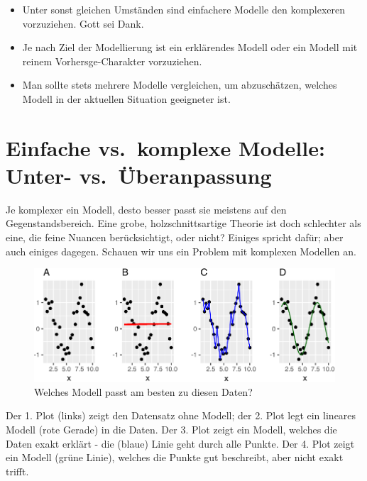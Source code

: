 \documentclass[12pt,]{book}
\begin{document}
\begin{itemize}
\item
  Unter sonst gleichen Umständen sind einfachere Modelle den komplexeren
  vorzuziehen. Gott sei Dank.
\item
  Je nach Ziel der Modellierung ist ein erklärendes Modell oder ein
  Modell mit reinem Vorhersge-Charakter vorzuziehen.
\item
  Man sollte stets mehrere Modelle vergleichen, um abzuschätzen, welches
  Modell in der aktuellen Situation geeigneter ist.
\end{itemize}

\section{Einfache vs.~komplexe Modelle: Unter-
vs.~Überanpassung}\label{einfache-vs.komplexe-modelle-unter--vs.uberanpassung}

Je komplexer ein Modell, desto besser passt sie meistens auf den
Gegenstandsbereich. Eine grobe, holzschnittsartige Theorie ist doch
schlechter als eine, die feine Nuancen berücksichtigt, oder nicht?
Einiges spricht dafür; aber auch einiges dagegen. Schauen wir uns ein
Problem mit komplexen Modellen an.

\begin{figure}

{\centering \includegraphics[width=0.9\linewidth]{060_Modellieren_files/figure-latex/overfitting-4-plots-1} 

}

\caption{Welches Modell passt am besten zu diesen Daten?}\label{fig:overfitting-4-plots}
\end{figure}

Der 1. Plot (links) zeigt den Datensatz ohne Modell; der 2. Plot legt
ein lineares Modell (rote Gerade) in die Daten. Der 3. Plot zeigt ein
Modell, welches die Daten exakt erklärt - die (blaue) Linie geht durch
alle Punkte. Der 4. Plot zeigt ein Modell (grüne Linie), welches die
Punkte gut beschreibt, aber nicht exakt trifft.
\end{document}
